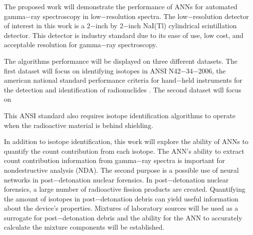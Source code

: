 \documentclass[tocnosub,noragright,centerchapter,12pt,fullpage]{uiucecethesis09}
\begin{document}
The proposed work will demonstrate the performance of ANNs for automated gamma$-$ray spectroscopy in low$-$resolution spectra. The low$-$resolution detector of interest in this work is a 2$-$inch by 2$-$inch NaI(Tl) cylindrical scintillation detector. This detector is industry standard due to its ease of use, low cost, and acceptable resolution for gamma$-$ray spectroscopy. 

The algorithms performance will be displayed on three different datasets. The first dataset will focus on identifying isotopes in ANSI N42$-$34$-$2006, the american national
standard performance criteria for hand$-$held instruments for the detection and identification of radionuclides \cite{ANSI}. The second dataset will focus on 

This ANSI standard also requires isotope identification algorithms to operate when the radioactive material is behind shielding.



In addition to isotope identification, this work will explore the ability of ANNs to quantify the count contribution from each isotope. The ANN's ability to extract count contribution information from gamma$-$ray spectra is important for nondestructive analysis (NDA). The second purpose is a possible use of neural networks in post$-$detonation nuclear forensics. In post$-$detonation nuclear forensics, a large number of radioactive fission products are created. Quantifying the amount of isotopes in post$-$detonation debris can yield useful information about the device's properties. Mixtures of laboratory sources will be used as a surrogate for post$-$detonation debris and the ability for the ANN to accurately calculate the mixture components will be established.   
\end{document}
